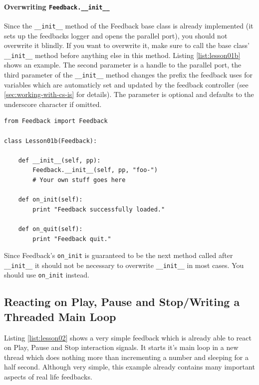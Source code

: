 \paragraph{Overwriting \lstinline+Feedback.__init__+} Since the \lstinline+__init__+ method of the Feedback base class is already implemented (it sets up the feedbacks logger and opens the parallel port), you should not overwrite it blindly. If you want to overwrite it, make sure to call the base class' \lstinline+__init__+ method before anything else in this method. Listing \ref{list:lesson01b} shows an example. The second parameter is a handle to the parallel port, the third parameter of the \lstinline+__init__+ method changes the prefix the feedback uses for variables which are automaticly set and updated by the feedback controller (see \ref{sec:working-with-cs-is} for details). The parameter is optional and defaults to the underscore character if omitted.

\begin{lstlisting}[caption=Trivial Feedback with \lstinline+__init__+ overwritten, label={list:lesson01b}]
from Feedback import Feedback

class Lesson01b(Feedback):
    
    def __init__(self, pp):
        Feedback.__init__(self, pp, "foo-")
        # Your own stuff goes here
    
    def on_init(self):
        print "Feedback successfully loaded."
    
    def on_quit(self):
        print "Feedback quit."
\end{lstlisting}

Since Feedback's \lstinline+on_init+ is guaranteed to be the next method called after \lstinline+__init__+ it should not be necessary to overwrite \lstinline+__init__+ in most cases. You should use \lstinline+on_init+ instead.

\subsection{Reacting on Play, Pause and Stop/Writing a Threaded Main Loop}
Listing \ref{list:lesson02} shows a very simple feedback which is already able to react on Play, Pause and Stop interaction signals. It starts it's main loop in a new thread which does nothing more than incrementing a number and sleeping for a half second. Although very simple, this example already contains many important aspects of real life feedbacks.

